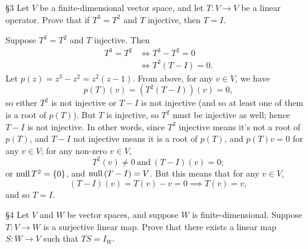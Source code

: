 \documentclass{homework}
\begin{document}
\begin{problem}{\S 3}
  Let $V$ be a finite-dimensional vector space, and let $T:V\to V$ be a linear operator. Prove that
  if $T^3=T^2$ and $T$ injective, then $T=I$.
\end{problem}
\begin{solution}
  Suppose $T^3=T^2$ and $T$ injective. Then
  \begin{align*}
    T^3=T^2 &\iff T^3-T^2=0\\
            &\iff T^2(T-I)=0
  .\end{align*}
  Let $p(z)=z^3-z^2=z^2(z-1)$. From above, for any $v\in V$, we have \[
    p(T)(v)=(T^2(T-I))(v)=0
  ,\] so either $T^2$ is not injective or $T-I$ is not injective (and so at least one of them is a
  root of $p(T)$). But $T$ is injective, so $T^2$ must be injective as well; hence $T-I$ is not
  injective. In other words, since $T^2$ injective means it's not a root of $p(T)$, and $T-I$ not
  injective means it is a root of $p(T)$, and $p(T)v=0$ for any $v\in V$; for any non-zero $v\in V$,
  \[
    T^2(v)\neq 0 ~\text{and}~ (T-I)(v)=0
  ;\] or $\operatorname{null}{T^2}=\{ 0 \}$, and $\operatorname{null}{(T-I)}=V$. But this means that for any $v\in V$, \[
  (T-I)(v)=T(v)-v=0 \implies T(v)=v
  ,\] and so $T=I$.
\end{solution}

\begin{problem}{\S 4}
  Let $V$ and $W$ be vector spaces, and suppose $W$ is finite-dimensional. Suppose $T:V\to W$ is a
  surjective linear map. Prove that there exists a linear map $S:W\to V$ such that $TS=I_W$.
\end{problem}
\end{document}

